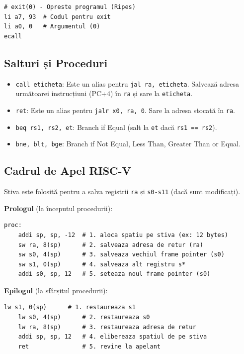\documentclass[12pt,a4paper]{article}
\begin{document}
\begin{lstlisting}[language=x86asm]
# exit(0) - Opreste programul (Ripes)
li a7, 93  # Codul pentru exit
li a0, 0   # Argumentul (0)
ecall
\end{lstlisting}

\subsection{Salturi și Proceduri}
\begin{itemize}
    \item \texttt{call eticheta}: Este un alias pentru \texttt{jal ra, eticheta}. Salvează adresa următoarei instrucțiuni (PC+4) în \texttt{ra} și sare la \texttt{eticheta}.
    \item \texttt{ret}: Este un alias pentru \texttt{jalr x0, ra, 0}. Sare la adresa stocată în \texttt{ra}.
    \item \texttt{beq rs1, rs2, et}: Branch if Equal (salt la \texttt{et} dacă \texttt{rs1 == rs2}).
    \item \texttt{bne, blt, bge}: Branch if Not Equal, Less Than, Greater Than or Equal.
\end{itemize}

\subsection{Cadrul de Apel RISC-V}
Stiva este folosită pentru a salva registrii \texttt{ra} și \texttt{s0-s11} (dacă sunt modificați).

\textbf{Prologul} (la începutul procedurii):
\begin{lstlisting}[language=x86asm]
proc:
    addi sp, sp, -12  # 1. aloca spatiu pe stiva (ex: 12 bytes)
    sw ra, 8(sp)      # 2. salveaza adresa de retur (ra)
    sw s0, 4(sp)      # 3. salveaza vechiul frame pointer (s0)
    sw s1, 0(sp)      # 4. salveaza alt registru s*
    addi s0, sp, 12   # 5. seteaza noul frame pointer (s0)
\end{lstlisting}

\textbf{Epilogul} (la sfârșitul procedurii):
\begin{lstlisting}[language=x86asm]
    lw s1, 0(sp)      # 1. restaureaza s1
    lw s0, 4(sp)      # 2. restaureaza s0
    lw ra, 8(sp)      # 3. restaureaza adresa de retur
    addi sp, sp, 12   # 4. elibereaza spatiul de pe stiva
    ret               # 5. revine la apelant
\end{lstlisting}
\end{document}
